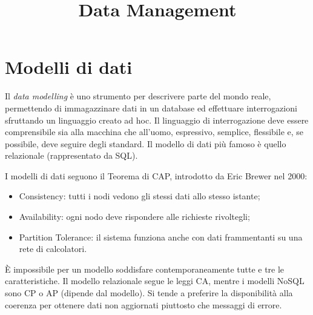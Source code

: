 \documentclass[a4page, 11pt]{article}
\title{Data Management}
\author{}
\date{}
\begin{document}
\maketitle

\tableofcontents
\newpage

\part{Modelli di dati}
Il \textit{data modelling} è uno strumento per descrivere parte del mondo reale, permettendo di immagazzinare dati in un database ed effettuare interrogazioni sfruttando un linguaggio creato ad hoc.
Il linguaggio di interrogazione deve essere comprensibile sia alla macchina che all'uomo, espressivo, semplice, flessibile e, se possibile, deve seguire degli standard.
Il modello di dati più famoso è quello relazionale (rappresentato da SQL).

I modelli di dati seguono il Teorema di CAP, introdotto da Eric Brewer nel 2000:
\begin{itemize}
\item Consistency: tutti i nodi vedono gli stessi dati allo stesso istante;
\item Availability: ogni nodo deve rispondere alle richieste rivoltegli;
\item Partition Tolerance: il sistema funziona anche con dati frammentanti su una rete di calcolatori.
\end{itemize}
È impossibile per un modello soddisfare contemporaneamente tutte e tre le caratteristiche\cite{NoSQLDB}.
Il modello relazionale segue le leggi CA, mentre i modelli NoSQL sono CP o AP (dipende dal modello).
Si tende a preferire la disponibilità alla coerenza per ottenere dati non aggiornati piuttosto che messaggi di errore.
\end{document}
